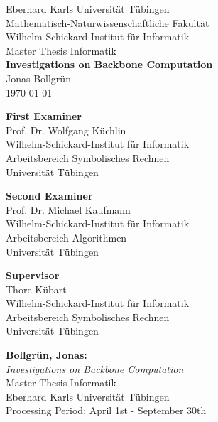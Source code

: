 \begin{titlepage}
 \begin{center}
  {\LARGE Eberhard Karls Universität Tübingen}\\
  {\large Mathematisch-Naturwissenschaftliche Fakultät \\
Wilhelm-Schickard-Institut für Informatik\\[3.0cm]}
  {\huge Master Thesis Informatik\\[2.5cm]}
  {\Large\bf  Investigations on Backbone Computation\\[1.5cm]}
 {\large Jonas Bollgrün}\\[0.5cm]
	\today \\[4.0cm]

\begin{multicols}{2}
\begin{center}{
\small\bf First Examiner}\\[0.2cm]
{\large Prof. Dr. Wolfgang Küchlin}\\
  {\footnotesize Wilhelm-Schickard-Institut für Informatik\\Arbeitsbereich Symbolisches Rechnen\\
	Universität Tübingen}	
\end{center}
\begin{center}{
\small\bf Second Examiner}\\[0.2cm]
{\large Prof. Dr. Michael Kaufmann}\\
  {\footnotesize Wilhelm-Schickard-Institut für Informatik\\Arbeitsbereich Algorithmen\\
	Universität Tübingen}	
\end{center}
	
\end{multicols}

\begin{center}
{\small\bf Supervisor}\\[0.2cm]
{\large Thore Kübart}\\
  {  \footnotesize Wilhelm-Schickard-Institut für Informatik\\Arbeitsbereich Symbolisches Rechnen\\Universität Tübingen}
  \end{center}
	
  \end{center}
\end{titlepage}




\thispagestyle{empty}
\vspace*{\fill}
\begin{minipage}{11.2cm}
\textbf{Bollgrün, Jonas:}\\
\emph{Investigations on Backbone Computation}\\
Master Thesis Informatik\\
Eberhard Karls Universität Tübingen\\
Processing Period: April 1st - September 30th
\end{minipage}
\newpage